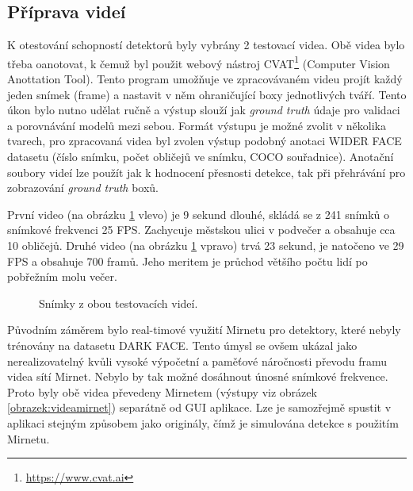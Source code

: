 \subsection*{Příprava videí}
K otestování schopností detektorů byly vybrány 2 testovací videa. Obě videa bylo třeba oanotovat, k čemuž byl použit webový nástroj CVAT\footnote{\url{https://www.cvat.ai}} (Computer Vision Anottation Tool). 
Tento program umožňuje ve zpracovávaném videu projít každý jeden snímek (frame) a nastavit v něm ohraničující boxy jednotlivých tváří. Tento úkon bylo nutno udělat ručně a výstup slouží jak \emph{ground truth} údaje pro validaci a porovnávání modelů mezi sebou. Formát výstupu je možné zvolit v několika tvarech, pro zpracovaná videa byl zvolen výstup podobný anotaci WIDER FACE datasetu (číslo snímku, počet obličejů ve snímku, COCO souřadnice). Anotační soubory videí lze použít jak k hodnocení přesnosti detekce, tak při přehrávání pro zobrazování \emph{ground truth} boxů. 

První video (na obrázku \ref{obrazek:videa} vlevo) je 9 sekund dlouhé, skládá se z 241 snímků o snímkové frekvenci 25 FPS. Zachycuje městskou ulici v podvečer a obsahuje cca 10 obličejů. Druhé video (na obrázku \ref{obrazek:videa} vpravo) trvá 23 sekund, je natočeno ve 29 FPS a obsahuje 700 framů. Jeho meritem je průchod většího počtu lidí po pobřežním molu večer.

\begin{figure}[H] 
  \begin{center}
  \label{obrazek:videa}
  \caption{Snímky z obou testovacích videí.}
  \end{center}
\end{figure}

Původním záměrem bylo real-timové využití Mirnetu pro detektory, které nebyly trénovány na datasetu DARK FACE. Tento úmysl se ovšem ukázal jako nerealizovatelný kvůli vysoké výpočetní a paměťové náročnosti převodu framu videa sítí Mirnet. Nebylo by tak možné dosáhnout únosné snímkové frekvence. Proto byly obě videa převedeny Mirnetem (výstupy viz obrázek \ref{obrazek:videamirnet}) separátně od GUI aplikace. Lze je samozřejmě spustit v aplikaci stejným způsobem jako originály, čímž je simulována detekce s použitím Mirnetu.

